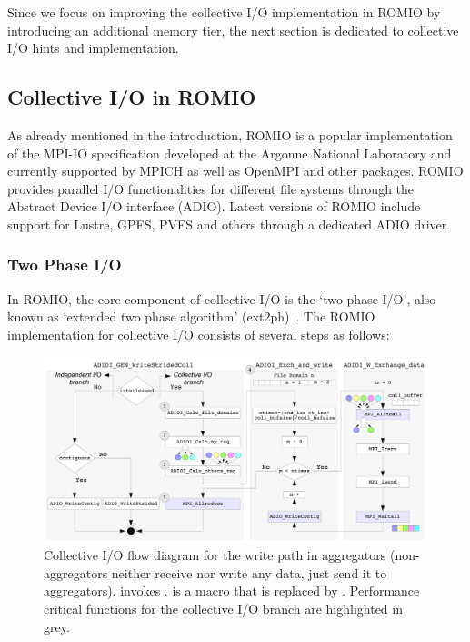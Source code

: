 Since we focus on improving the collective I/O implementation in ROMIO by introducing an additional memory tier, the next section is dedicated to collective I/O hints and implementation.

\subsection{Collective I/O in ROMIO}
\label{subsec: collio}
As already mentioned in the introduction, ROMIO is a popular implementation of the MPI-IO specification developed at the Argonne National Laboratory and currently supported by MPICH as well as OpenMPI and other packages. ROMIO provides parallel I/O functionalities for different file systems through the Abstract Device I/O interface (ADIO). Latest versions of ROMIO include support for Lustre, GPFS, PVFS and others through a dedicated ADIO driver.

\subsubsection{Two Phase I/O}
\label{subsubsec: ext2ph}
In ROMIO, the core component of collective I/O is the `two phase I/O', also known as `extended two phase algorithm' (ext2ph)~\cite{ThakurC96}. The ROMIO implementation for collective I/O consists of several steps as follows:
\begin{figure}[!htb]
  \centering
  \includegraphics[width=\textwidth]{chapters/chapter3/figures/ext2ph}
  \caption{Collective I/O flow diagram for the write path in aggregators (non-aggregators neither receive nor write any data, just send it to aggregators).  invokes .  is a macro that is replaced by . Performance critical functions for the collective I/O branch are highlighted in grey.}
  \label{figure: coll_io_impl}
\end{figure}

